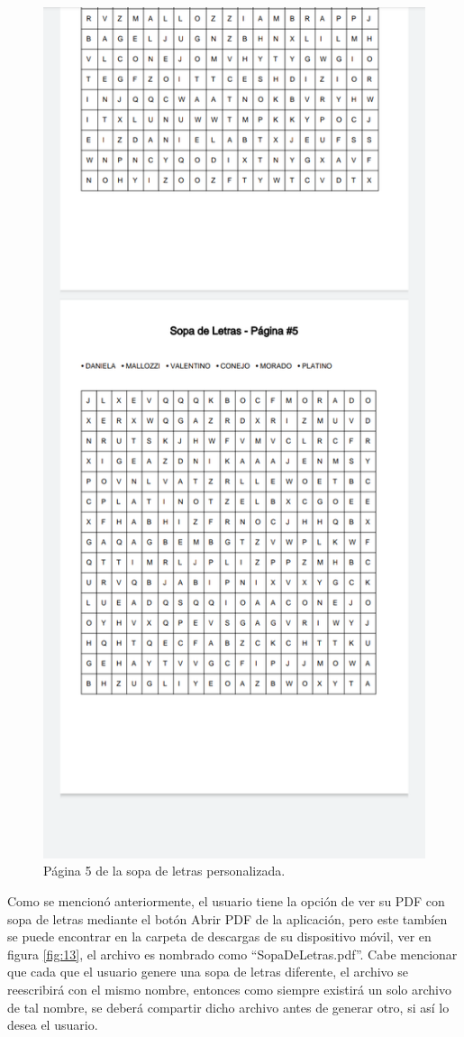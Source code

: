 \documentclass[conference]{IEEEtran}
\begin{document}
\begin{figure}[H]
    \centering
    \includegraphics[width=0.4\columnwidth]{imagenes/ver_pdf5.png}
    \caption{Página 5 de la sopa de letras personalizada.}
    \label{fig:12}
\end{figure}





Como se mencionó anteriormente, el usuario tiene la opción de ver su PDF con sopa de letras mediante el botón Abrir PDF de la aplicación, pero este tambíen se puede encontrar en la carpeta de descargas de su dispositivo móvil, ver en figura \ref{fig:13}, el archivo es nombrado como \enquote{SopaDeLetras.pdf}. Cabe mencionar que cada que el usuario genere una sopa de letras diferente, el archivo se reescribirá con el mismo nombre, entonces como siempre existirá un solo archivo de tal nombre, se deberá compartir dicho archivo antes de generar otro, si así lo desea el usuario.
\end{document}
